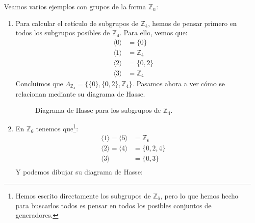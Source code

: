 \begin{ejemplo}
    Veamos varios ejemplos con grupos de la forma $\mathbb{Z}_n$:
    \begin{enumerate}
        \item Para calcular el retículo de subgrupos de $\mathbb{Z}_4$, hemos de pensar primero en todos los subgrupos posibles de $\mathbb{Z}_4$. Para ello, vemos que:
            \begin{align*}
                \langle {0} \rangle &= \{{0}\} \\
                \langle {1} \rangle &= \mathbb{Z}_4 \\
                \langle {2} \rangle &= \{{0},{2}\} \\
                \langle {3} \rangle &= \mathbb{Z}_4 
            \end{align*}
            Concluimos que $\Lambda_{\mathbb{Z}_4} = \{\{{0}\}, \{{0},{2}\}, \mathbb{Z}_4\}$. Pasamos ahora a ver cómo se relacionan mediante su diagrama de Hasse.
            \begin{figure}[H]
                \centering
                \caption{Diagrama de Hasse para los subgrupos de $\mathbb{Z}_4$.}
                \label{fig:hasse_z4}
            \end{figure}
        \item En $\mathbb{Z}_6$ tenemos que\footnote{Hemos escrito directamente los subgrupos de $\mathbb{Z}_6$, pero lo que hemos hecho para buscarlos todos es pensar en todos los posibles conjuntos de generadores.}:
            \begin{align*}
                \langle {1} \rangle  = \langle {5} \rangle  &= \mathbb{Z}_6 \\
                \langle {2} \rangle = \langle {4} \rangle  &= \{0, 2, 4\} \\
                \langle {3} \rangle  &= \{0,3\} \\
            \end{align*}
            Y podemos dibujar su diagrama de Hasse:


\end{enumerate}
\end{ejemplo}
